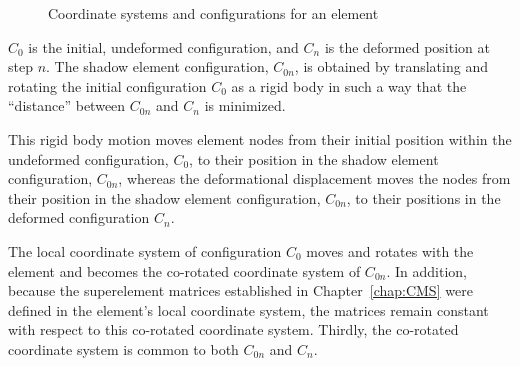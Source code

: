 \begin{figure}[b]
\caption{Coordinate systems and configurations for an element}
\label{figSC:61}
\end{figure}
%
$C_0$ is the initial, undeformed configuration, and $C_n$ is the deformed
position at step $n$.
The shadow element configuration, $C_{0n}$, is obtained by translating and
rotating the initial configuration $C_0$ as a rigid body in such a way that the
``distance'' between $C_{0n}$ and $C_n$ is minimized.

This rigid body motion moves element nodes from their initial position within
the undeformed configuration, $C_0$, to their position in the shadow element
configuration, $C_{0n}$, whereas the deformational displacement moves the nodes
from their position in the shadow element configuration, $C_{0n}$,
to their positions in the deformed configuration $C_n$.

The local coordinate system of configuration $C_0$ moves and rotates with the
element and becomes the co-rotated coordinate system of $C_{0n}$.
In addition, because the superelement matrices established in
Chapter~\ref{chap:CMS} were defined in the element's local coordinate system,
the matrices remain constant with respect to this co-rotated coordinate system.
Thirdly, the co-rotated coordinate system is common to both $C_{0n}$ and $C_n$.

